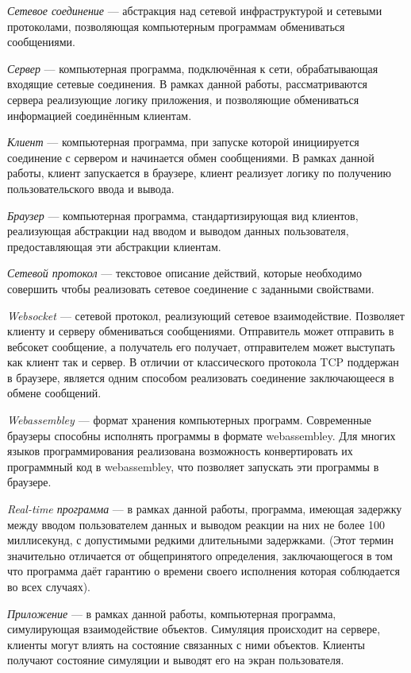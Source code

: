 \documentclass[a4paper,14pt, openany]{book}
\begin{document}
\emph{Сетевое соединение} --- абстракция над сетевой инфраструктурой и сетевыми протоколами, позволяющая компьютерным программам обмениваться сообщениями.

\emph{Сервер} --- компьютерная программа, подключённая к сети,  обрабатывающая входящие сетевые соединения. В рамках данной работы, рассматриваются сервера реализующие логику приложения, и позволяющие обмениваться информацией соединённым клиентам. 

\emph{Клиент} --- компьютерная программа, при запуске которой инициируется соединение с сервером и начинается обмен сообщениями. В рамках данной работы, клиент запускается в браузере, клиент реализует логику по получению пользовательского ввода и вывода.

\emph{Браузер} --- компьютерная программа, стандартизирующая вид клиентов, реализующая абстракции над вводом и выводом данных пользователя, предоставляющая эти абстракции клиентам.

\emph{Сетевой протокол} --- текстовое описание действий, которые необходимо совершить чтобы реализовать сетевое соединение с заданными свойствами.

\emph{Websocket \cite{websocket}} --- сетевой протокол, реализующий сетевое взаимодействие. Позволяет клиенту и серверу обмениваться сообщениями. Отправитель может отправить в вебсокет сообщение, а получатель его получает, отправителем может выступать как клиент так и сервер. В отличии от классического протокола TCP поддержан в браузере, является одним способом реализовать соединение заключающееся в обмене сообщений.

\emph{Webassembley \cite{webassembley}} --- формат хранения компьютерных программ. Современные браузеры способны исполнять программы в формате webassembley. Для многих языков программирования реализована возможность конвертировать их программный код в webassembley, что позволяет запускать эти программы в браузере.

\emph{Real-time программа} --- в рамках данной работы, программа, имеющая задержку между вводом пользователем данных и выводом реакции на них не более 100 миллисекунд, с допустимыми редкими длительными задержками. (Этот термин значительно отличается от общепринятого определения, заключающегося в том что программа даёт гарантию о времени своего исполнения которая соблюдается во всех случаях). 

\emph{Приложение} --- в рамках данной работы, компьютерная программа, симулирующая взаимодействие объектов. Симуляция происходит на сервере, клиенты могут влиять на состояние связанных с ними объектов. Клиенты получают состояние симуляции и выводят его на экран пользователя.
\end{document}
